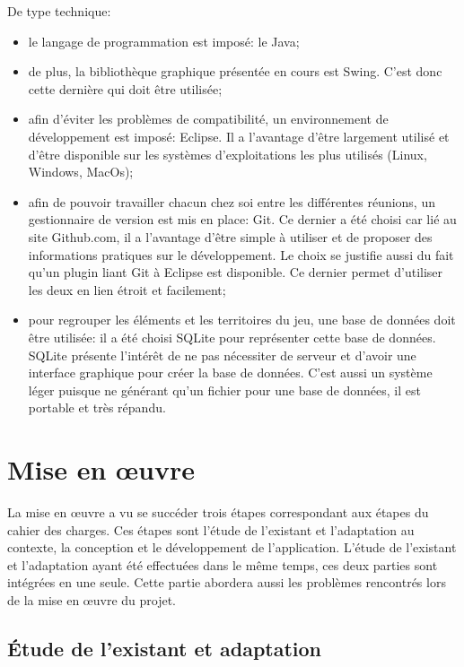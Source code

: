 \documentclass[a4paper, 11pt]{article}
\begin{document}
		De type technique:
		\begin{itemize}
			\item le langage de programmation est imposé: le Java;
			\item de plus, la bibliothèque graphique présentée en cours est Swing. C'est donc cette dernière qui doit être utilisée;
			\item afin d'éviter les problèmes de compatibilité, un environnement de développement est imposé: Eclipse. Il a l'avantage d'être largement utilisé et d'être disponible sur les systèmes d'exploitations les plus utilisés (Linux, Windows, MacOs);
			\item afin de pouvoir travailler chacun chez soi entre les différentes réunions, un gestionnaire de version est mis en place: Git. Ce dernier a été choisi car lié au site Github.com, il a l'avantage d'être simple à utiliser et de proposer des informations pratiques sur le développement. Le choix se justifie aussi du fait qu'un plugin liant Git à Eclipse est disponible. Ce dernier permet d'utiliser les deux en lien étroit et facilement;
			\item pour regrouper les éléments et les territoires du jeu, une base de données doit être utilisée: il a été choisi SQLite pour représenter cette base de données. SQLite présente l'intérêt de ne pas nécessiter de serveur et d'avoir une interface graphique pour créer la base de données. C'est aussi un système léger puisque ne générant qu'un fichier pour une base de données, il est portable et très répandu.
		\end{itemize}
		
		\newpage
		
	\section{Mise en œuvre}
	
		La mise en œuvre a vu se succéder trois étapes correspondant aux étapes du cahier des charges. Ces étapes sont l'étude de l'existant et l'adaptation au contexte, la conception et le développement de l'application. L'étude de l'existant et l'adaptation ayant été effectuées dans le même temps, ces deux parties sont intégrées en une seule. Cette partie abordera aussi les problèmes rencontrés lors de la mise en œuvre du projet.
		
		\subsection{Étude de l'existant et adaptation}
		
\end{document}
